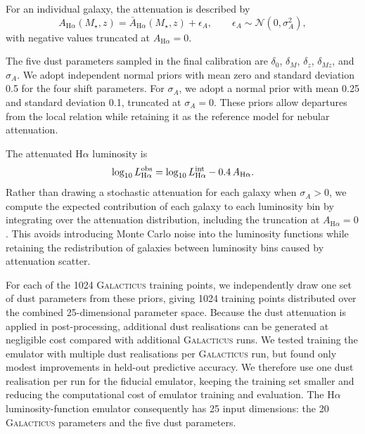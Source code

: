 \documentclass[twocolumn, apj, numberedappendix, iop]{openjournal}
\newcommand{\galacticus}{\textsc{Galacticus}\xspace}
\newcommand{\ha}{H$\alpha$}
\newcommand{\Hamath}{\mathrm{H}\alpha}
\newcommand{\gbten}{\citetalias{2010MNRAS.409..421G}\xspace}
\begin{document}
For an individual galaxy, the attenuation is described by
\begin{equation}
  A_{\Hamath}(M_\star,z)
  =
  \bar{A}_{\Hamath}(M_\star,z) + \epsilon_A,
  \qquad
  \epsilon_A \sim \mathcal{N}(0,\sigma_A^2),
\end{equation}
with negative values truncated at $A_{\Hamath}=0$.

The five dust parameters sampled in the final calibration are
$\delta_0$, $\delta_M$, $\delta_z$, $\delta_{Mz}$, and $\sigma_A$.
We adopt independent normal priors with mean zero and standard deviation 0.5
for the four shift parameters. For $\sigma_A$, we adopt a normal prior with
mean 0.25 and standard deviation 0.1, truncated at $\sigma_A=0$. These priors
allow departures from the local \gbten{} relation while retaining it as the
reference model for nebular attenuation.

The attenuated \ha{} luminosity is
\begin{equation}
  \log_{10} L_{\Hamath}^{\rm obs}
  =
  \log_{10} L_{\Hamath}^{\rm int}
  - 0.4 \, A_{\Hamath}.
\end{equation}
Rather than drawing a stochastic attenuation for each galaxy when
$\sigma_A>0$, we compute the expected contribution of each galaxy to each
luminosity bin by integrating over the attenuation distribution, including the
truncation at $A_{\Hamath}=0$. This avoids introducing Monte Carlo noise into the luminosity functions while retaining the redistribution of galaxies between luminosity bins caused by attenuation scatter.

For each of the 1024 \galacticus{} training points, we independently draw one
set of dust parameters from these priors, giving 1024 training points
distributed over the combined 25-dimensional parameter space. Because the dust
attenuation is applied in post-processing, additional dust realisations can be
generated at negligible cost compared with additional \galacticus{} runs. We tested training the emulator with multiple dust realisations per
\galacticus{} run, but found only modest improvements in held-out predictive
accuracy. We therefore use one dust realisation per run for the fiducial
emulator, keeping the training set smaller and reducing the computational cost
of emulator training and evaluation. The \ha{} luminosity-function emulator consequently has 25 input
dimensions: the 20 \galacticus{} parameters and the five dust parameters.

\end{document}
